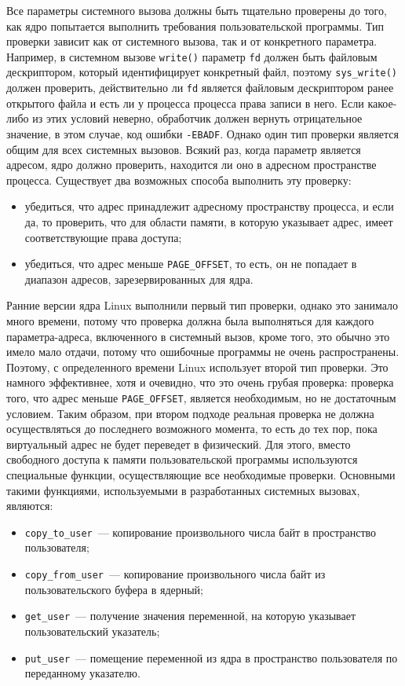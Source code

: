 Все параметры системного вызова должны быть тщательно проверены до того, как
ядро попытается выполнить требования пользовательской программы. Тип проверки
зависит как от системного вызова, так и от конкретного параметра. Например, в
системном вызове \texttt{write()} параметр \texttt{fd} должен быть файловым
дескриптором, который идентифицирует конкретный файл, поэтому
\texttt{sys\_write()} должен проверить, действительно ли \texttt{fd} является
файловым дескриптором ранее открытого файла и есть ли у процесса процесса права
записи в него. Если какое-либо из этих условий неверно, обработчик должен
вернуть отрицательное значение, в этом случае, код ошибки \texttt{-EBADF}.
Однако один тип проверки является общим для всех системных вызовов. Всякий раз,
когда параметр является адресом, ядро должно проверить, находится ли оно в
адресном пространстве процесса. Существует два возможных способа выполнить эту
проверку:
\begin{itemize}
\item убедиться, что адрес принадлежит адресному пространству процесса, и если
  да, то проверить, что для области памяти, в которую указывает адрес, имеет
  соответствующие права доступа;
\item убедиться, что адрес меньше \texttt{PAGE\_OFFSET}, то есть, он не попадает
  в диапазон адресов, зарезервированных для ядра.
\end{itemize}

Ранние версии ядра Linux выполнили первый тип проверки, однако это занимало
много времени, потому что проверка должна была выполняться для каждого
параметра-адреса, включенного в системный вызов, кроме того, это обычно это
имело мало отдачи, потому что ошибочные программы не очень распространены.
Поэтому, с определенного времени Linux использует второй тип проверки. Это
намного эффективнее, хотя и очевидно, что это очень грубая проверка: проверка
того, что адрес меньше \texttt{PAGE\_OFFSET}, является необходимым, но не
достаточным условием. Таким образом, при втором подходе реальная проверка не
должна осуществляться до последнего возможного момента, то есть до тех пор, пока
виртуальный адрес не будет переведет в физический. Для этого, вместо свободного
доступа к памяти пользовательской программы используются специальные функции,
осуществляющие все необходимые проверки. Основными такими функциями,
используемыми в разработанных системных вызовах, являются:
\begin{itemize}
\item \texttt{copy\_to\_user}~--- копирование произвольного числа байт в
  пространство пользователя;
\item \texttt{copy\_from\_user}~--- копирование произвольного числа байт из
  пользовательского буфера в ядерный;
\item \texttt{get\_user}~--- получение значения переменной, на которую указывает
  пользовательский указатель;
\item \texttt{put\_user}~--- помещение переменной из ядра в пространство
  пользователя по переданному указателю.
\end{itemize}

